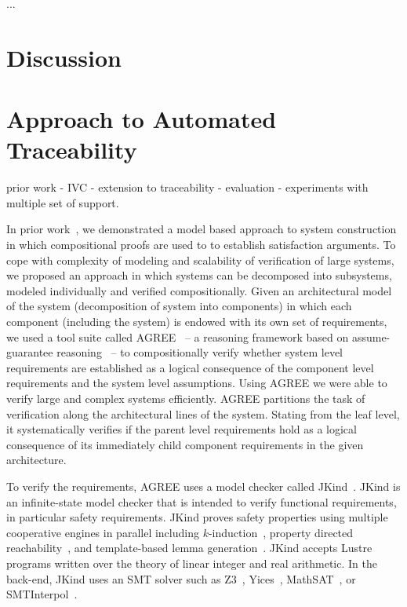...
\section{Discussion}




\iffalse
\section{Approach to Automated Traceability}
\label{sec:set-of-support}

prior work - IVC - extension to traceability - evaluation - experiments with multiple set of support.

%
%
%

In prior work~\cite{hilt2013}, we demonstrated a model based approach to system construction in which compositional proofs are used to to establish satisfaction arguments. To cope with complexity of modeling and scalability of verification of large systems, we proposed an approach in which systems can be decomposed into subsystems, modeled individually and verified compositionally. Given an architectural model of the system (decomposition of system into components) in which each component (including the system) is endowed with its own set of requirements, we used a tool suite called AGREE~\cite{NFM2012:CoGaMiWhLaLu} -- a reasoning framework based on assume-guarantee reasoning~\cite{McMillan99:circ} -- to compositionally verify whether system level requirements are established as a logical consequence of the component level requirements and the system level assumptions. Using AGREE we were able to verify large and complex systems efficiently. AGREE partitions the task of verification along the architectural lines of the system. Stating from the leaf level, it systematically verifies if the parent level requirements hold as a logical consequence of its immediately child component requirements in the given architecture.

To verify the requirements, AGREE uses a model checker called JKind~\cite{JKIND link}. JKind is an infinite-state model checker that is intended to verify functional requirements, in particular safety requirements. JKind proves safety properties using multiple cooperative engines in parallel including $k$-induction~\cite{SheeranSS00}, property directed reachability~\cite{Een2011:PDR}, and template-based lemma generation~\cite{Kahsai2011}. JKind accepts Lustre programs written over the theory of linear integer and real arithmetic. In the back-end, JKind uses an SMT solver such as Z3~\cite{DeMoura08:z3}, Yices~\cite{Dutertre06:yices}, MathSAT~\cite{Cimatti2013:MathSAT}, or
SMTInterpol~\cite{Christ2012:SMTInterpol}.


